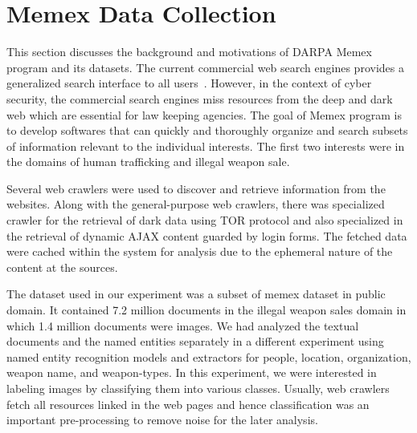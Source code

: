 \section{Memex Data Collection}
\label{sec:memex-datacollection}
This section discusses the background and motivations of DARPA Memex program and its datasets. The current commercial web search engines provides a generalized search interface to all users~\cite{}. However, in the context of cyber security, the commercial search engines miss resources from the deep and dark web which are essential for law keeping agencies. The goal of Memex program is to develop softwares that can quickly and thoroughly organize and search subsets of information relevant to the individual interests. The first two interests were in the domains of human trafficking and illegal weapon sale.

Several web crawlers were used to discover and retrieve information from the websites.
Along with the general-purpose web crawlers, there was specialized crawler for the retrieval of dark data using TOR protocol \cite{} and also specialized in the retrieval of dynamic AJAX content guarded by login forms. The fetched data were cached within the system for analysis due to the ephemeral nature of the content at the sources.

The dataset used in our experiment was a subset of memex dataset in public domain. It contained 7.2 million documents in the illegal weapon sales domain in which 1.4 million documents were images. We had analyzed the textual documents and the named entities separately in a different experiment using named entity recognition models and extractors for people, location, organization, weapon name, and weapon-types. In this experiment, we were interested in labeling images by classifying them into various classes. Usually, web crawlers fetch all resources linked in the web pages and hence classification was an important pre-processing to remove noise for the later analysis.